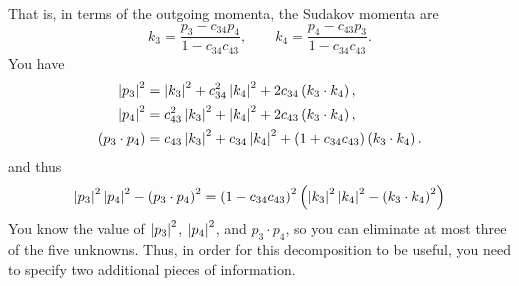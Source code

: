 That is, in terms of the outgoing momenta, the Sudakov momenta are
\begin{equation}
	k_{3} = \frac{p_{3} - c_{34} p_{4}}{1 - c_{34} c_{43}}, \qquad k_{4} = \frac{p_{4} - c_{43} p_{3}}{1 - c_{34} c_{43}}.
\end{equation}
You have
\begin{align}
	\left\lvert p_{3} \right\rvert^{2} &= \left\lvert k_{3} \right\rvert^{2} + c_{34}^{2} \left\lvert k_{4} \right\rvert^{2} + 2 c_{34} \left( k_{3} \cdot k_{4} \right), \\
	\left\lvert p_{4} \right\rvert^{2} &= c_{43}^{2} \left\lvert k_{3} \right\rvert^{2} + \left\lvert k_{4} \right\rvert^{2} + 2 c_{43} \left( k_{3} \cdot k_{4} \right), \\
	\left(p_{3} \cdot p_{4} \right) &= c_{43} \left\lvert k_{3} \right\rvert^{2} + c_{34} \left\lvert k_{4} \right\rvert^{2} + \left( 1 + c_{34} c_{43} \right) \left( k_{3} \cdot k_{4} \right).
\end{align}
and thus
\begin{equation}
	\left\lvert p_{3} \right\rvert^{2} \left\lvert p_{4} \right\rvert^{2} - \left( p_{3} \cdot p_{4} \right)^{2} = \left(1 - c_{34} c_{43} \right)^{2} \left( \left\lvert k_{3} \right\rvert^{2} \left\lvert k_{4} \right\rvert^{2} - \left( k_{3} \cdot k_{4} \right)^{2} \right)
\end{equation}
You know the value of $\left\lvert p_{3} \right\rvert^{2}$, $\left\lvert p_{4} \right\rvert^{2}$, and $p_{3} \cdot p_{4}$, so you can eliminate at most three of the five unknowns. Thus, in order for this decomposition to be useful, you need to specify two additional pieces of information.

